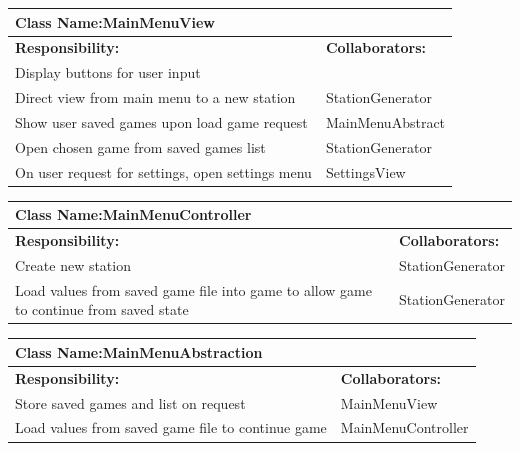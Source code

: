 \documentclass[]{article}
\begin{document}
	\begin{table}[ht]
		\centering
		\begin{tabular}{|p{5cm}|p{5cm}|}
		\hline 
		 \multicolumn{2}{|l|}{\textbf{Class Name:}MainMenuView} \\
		\hline
		\textbf{Responsibility:} & \textbf{Collaborators:} \\
		\hline
		Display buttons for user input & \\
		\hline
		Direct view from main menu to a new station & StationGenerator\\
		\hline
		Show user saved games upon load game request & MainMenuAbstract \\
		\hline
		Open chosen game from saved games list  & StationGenerator \\
		\hline
		On user request for settings, open settings menu & SettingsView\\
		\hline
		\end{tabular}
	\end{table}
	\begin{table}[ht]
		\centering
		\begin{tabular}{|p{5cm}|p{5cm}|}
		\hline 
		 \multicolumn{2}{|l|}{\textbf{Class Name:}MainMenuController} \\
		\hline
		\textbf{Responsibility:} & \textbf{Collaborators:} \\
		\hline
		Create new station & StationGenerator\\
		\hline
		Load values from saved game file into game to allow game to continue from saved state & StationGenerator\\
		\hline
		\end{tabular}
	\end{table}
	\begin{table}[ht]
		\centering
		\begin{tabular}{|p{5cm}|p{5cm}|}
		\hline 
		 \multicolumn{2}{|l|}{\textbf{Class Name:}MainMenuAbstraction} \\
		\hline
		\textbf{Responsibility:} & \textbf{Collaborators:} \\
		\hline
		Store saved games and list on request & MainMenuView\\
		\hline
		Load values from saved game file to continue game & MainMenuController\\
		\hline
		\end{tabular}
	\end{table}
\end{document}
